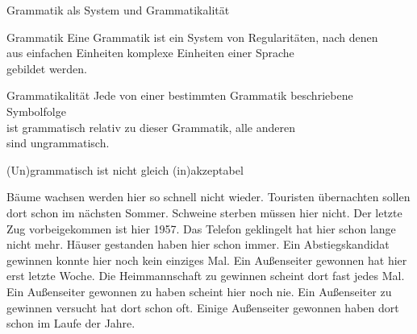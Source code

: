 \begin{frame}
  {Grammatik als System und Grammatikalität}
  \onslide<+->
  \onslide<+->
  \Large\begin{block}{Grammatik}
    Eine Grammatik ist ein \alert{System von Regularitäten}, nach denen\\
    aus einfachen Einheiten komplexe Einheiten einer Sprache\\
    gebildet werden.
  \end{block}
  \Zeile

  \onslide<+->

  \begin{block}{Grammatikalität}
    Jede von einer bestimmten Grammatik beschriebene Symbolfolge\\
    ist \alert{grammatisch} relativ zu dieser Grammatik, alle anderen\\
    sind \alert{ungrammatisch}.
  \end{block}
\end{frame}

\begin{frame}
  {(Un)grammatisch ist nicht gleich (in)akzeptabel}
  \onslide<+->
  \onslide<+->
  \begin{exe}
    \ex\begin{xlist}
      \ex Bäume wachsen werden hier so schnell nicht wieder.
      \onslide<+->
      \ex Touristen übernachten sollen dort schon im nächsten Sommer.
      \onslide<+->
      \ex Schweine sterben müssen hier nicht.
      \onslide<+->
      \ex Der letzte Zug vorbeigekommen ist hier 1957.
      \onslide<+->
      \ex Das Telefon geklingelt hat hier schon lange nicht mehr.
      \onslide<+->
      \ex Häuser gestanden haben hier schon immer.
      \onslide<+->
      \ex Ein Abstiegskandidat gewinnen konnte hier noch kein einziges Mal.
      \onslide<+->
      \ex Ein Außenseiter gewonnen hat hier erst letzte Woche.
      \onslide<+->
      \ex Die Heimmannschaft zu gewinnen scheint dort fast jedes Mal.
      \onslide<+->
      \ex Ein Außenseiter gewonnen zu haben scheint hier noch nie.
      \onslide<+->
      \ex Ein Außenseiter zu gewinnen versucht hat dort schon oft.
      \onslide<+->
      \ex Einige Außenseiter gewonnen haben dort schon im Laufe der Jahre.
    \end{xlist}
  \end{exe}
\end{frame}

